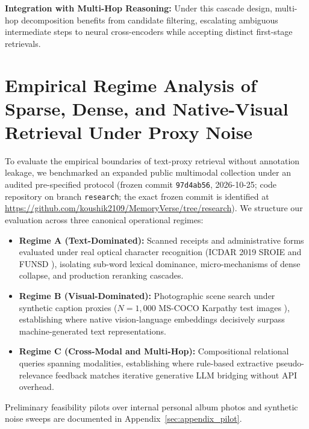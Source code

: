 \documentclass[conference]{IEEEtran}
\begin{document}
\textbf{Integration with Multi-Hop Reasoning:} Under this cascade design, multi-hop decomposition benefits from candidate filtering, escalating ambiguous intermediate steps to neural cross-encoders while accepting distinct first-stage retrievals.


\section{Empirical Regime Analysis of Sparse, Dense, and Native-Visual Retrieval Under Proxy Noise}
\label{sec:regime_analysis}
\label{sec:public_regime_analysis}

To evaluate the empirical boundaries of text-proxy retrieval without annotation leakage, we benchmarked an expanded public multimodal collection under an audited pre-specified protocol (frozen commit \texttt{97d4ab56}, 2026-10-25; code repository on branch \texttt{research}; the exact frozen commit is identified at \url{https://github.com/koushik2109/MemoryVerse/tree/research}). We structure our evaluation across three canonical operational regimes:
\begin{itemize}
    \setlength{\itemsep}{0.2pt plus 0.1pt}
    \setlength{\parskip}{0pt}
    \item \textbf{Regime A (Text-Dominated):} Scanned receipts and administrative forms evaluated under real optical character recognition (ICDAR 2019 SROIE \cite{huang2019sroie} and FUNSD \cite{jaume2019funsd}), isolating sub-word lexical dominance, micro-mechanisms of dense collapse, and production reranking cascades.
    \item \textbf{Regime B (Visual-Dominated):} Photographic scene search under synthetic caption proxies ($N=1{,}000$ MS-COCO Karpathy test images \cite{lin2014coco}), establishing where native vision-language embeddings decisively surpass machine-generated text representations.
    \item \textbf{Regime C (Cross-Modal and Multi-Hop):} Compositional relational queries spanning modalities, establishing where rule-based extractive pseudo-relevance feedback matches iterative generative LLM bridging without API overhead.
\end{itemize}
Preliminary feasibility pilots over internal personal album photos and synthetic noise sweeps are documented in Appendix~\ref{sec:appendix_pilot}.
\end{document}

